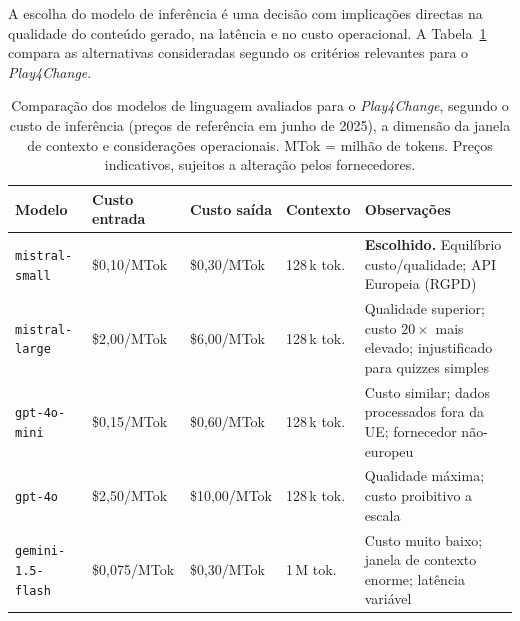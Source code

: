 A escolha do modelo de inferência é uma decisão com implicações directas na qualidade do conteúdo gerado, na latência e no custo operacional. A Tabela~\ref{tab:comparacao-modelos} compara as alternativas consideradas segundo os critérios relevantes para o \emph{Play4Change}.

\begin{table}[htbp]
    \centering
    \small
    \begin{tabular}{p{3.0cm} p{2.2cm} p{2.2cm} p{1.8cm} p{3.5cm}}
        \toprule
        \textbf{Modelo} &
        \textbf{Custo entrada} &
        \textbf{Custo saída} &
        \textbf{Contexto} &
        \textbf{Observações} \\
        \midrule
        \texttt{mistral-small} &
            \$0,10/MTok &
            \$0,30/MTok &
            128\,k tok. &
            \textbf{Escolhido.} Equilíbrio custo/qualidade; API Europeia (RGPD) \\
        \addlinespace
        \texttt{mistral-large} &
            \$2,00/MTok &
            \$6,00/MTok &
            128\,k tok. &
            Qualidade superior; custo $20\times$ mais elevado; injustificado para quizzes simples \\
        \addlinespace
        \texttt{gpt-4o-mini} &
            \$0,15/MTok &
            \$0,60/MTok &
            128\,k tok. &
            Custo similar; dados processados fora da UE; fornecedor não-europeu \\
        \addlinespace
        \texttt{gpt-4o} &
            \$2,50/MTok &
            \$10,00/MTok &
            128\,k tok. &
            Qualidade máxima; custo proibitivo a escala \\
        \addlinespace
        \texttt{gemini-1.5-flash} &
            \$0,075/MTok &
            \$0,30/MTok &
            1\,M tok. &
            Custo muito baixo; janela de contexto enorme; latência variável \\
        \bottomrule
    \end{tabular}
    \caption[Comparação de modelos de linguagem considerados]{Comparação dos modelos de linguagem avaliados para o \emph{Play4Change}, segundo o custo de inferência (preços de referência em junho de 2025), a dimensão da janela de contexto e considerações operacionais. MTok = milhão de tokens. Preços indicativos, sujeitos a alteração pelos fornecedores.}
    \label{tab:comparacao-modelos}
\end{table}

